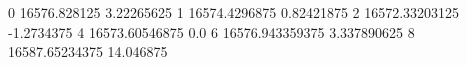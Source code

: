 0 16576.828125 3.22265625
1 16574.4296875 0.82421875
2 16572.33203125 -1.2734375
4 16573.60546875 0.0
6 16576.943359375 3.337890625
8 16587.65234375 14.046875
